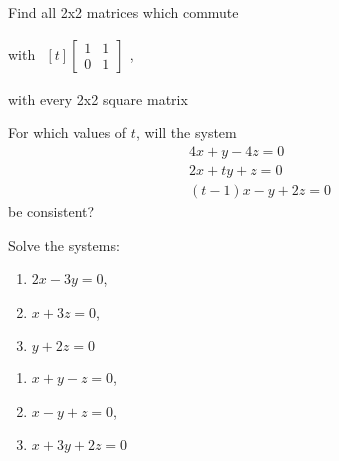 \documentclass[11pt]{amsbook}
\begin{document}

\begin{hEnumerateArabic}

\item Find all 2x2 matrices which commute
  \begin{multicols}{2}
    \begin{hEnumerateAlpha}
      \item with
        $
        \begin{aligned}[t]
          \begin{bmatrix}
            1 & 1 \\
            0 & 1
          \end{bmatrix}
        \end{aligned}
        $,

      \item with every 2x2 square matrix
    \end{hEnumerateAlpha}
  \end{multicols}

\item For which values of $t$, will the system
  \[
  \begin{aligned}
    4x + y - 4z = 0 \\
    2x + ty + z = 0 \\
    (t-1)x - y + 2z = 0
  \end{aligned}
  \]
be consistent?
\\

\item Solve the systems:
  \begin{hEnumerateAlpha}
    \item
      \begin{multicols}{3}
        \begin{enumerate}[label={}]
          \item $2x - 3y = 0$,
          \item $x + 3z = 0$,
          \item $y + 2z = 0$
        \end{enumerate}
      \end{multicols}

    \item
      \begin{multicols}{3}
        \begin{enumerate}[label={}]
          \item $x + y - z = 0$,
          \item $x - y + z = 0$,
          \item $x + 3y + 2z = 0$
        \end{enumerate}
      \end{multicols}
  \end{hEnumerateAlpha}


\end{hEnumerateArabic}
\end{document}
